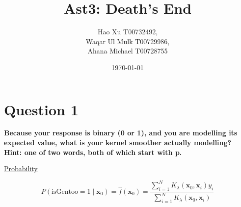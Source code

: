 \documentclass[12pt]{article}
\title{Ast3: Death's End}
\author{
Hao Xu T00732492,\\
Waqar Ul Mulk T00729986,\\
Ahana Michael T00728755}
\date{\today}
\begin{document}
	
\maketitle

\section{Question 1}

\textbf{Because your response is binary (0 or 1), and you are modelling its expected value, what is your kernel smoother actually modelling? Hint: one of two words, both of which start with p.}

\underline{Probability}

\[
P(\text{isGentoo}=1 \mid \mathbf{x}_0) = \hat{f}(\mathbf{x}_0) = \frac{\sum_{i=1}^{N} K_\lambda\left( \mathbf{x}_0, \mathbf{x}_i \right) y_i}{\sum_{i=1}^{N} K_\lambda\left( \mathbf{x}_0, \mathbf{x}_i \right)}
\] 
\end{document}
